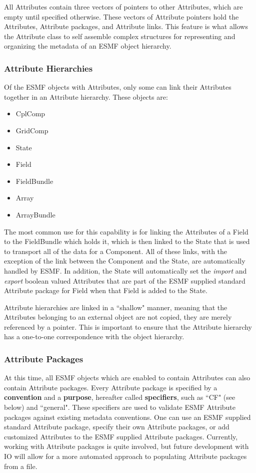 All Attributes contain three vectors of pointers to other Attributes, which are empty until specified otherwise.  These vectors of Attribute pointers hold the Attributes, Attribute packages, and Attribute links.  This feature is what allows the Attribute class to self assemble complex structures for representing and organizing the metadata of an ESMF object hierarchy.

\subsubsection{Attribute Hierarchies}

Of the ESMF objects with Attributes, only some can link their Attributes together in an Attribute hierarchy.  These objects are:

\begin{itemize}
\item CplComp
\item GridComp
\item State
\item Field
\item FieldBundle
\item Array
\item ArrayBundle
\end{itemize}

The most common use for this capability is for linking the Attributes of a Field to the FieldBundle which holds it, which is then linked to the State that is used to transport all of the data for a Component.  All of these links, with the exception of the link between the Component and the State, are automatically handled by ESMF.  In addition, the State will automatically set the {\it import} and {\it export} boolean valued Attributes that are part of the ESMF supplied standard Attribute package for Field when that Field is added to the State. 

Attribute hierarchies are linked in a ``shallow" manner, meaning that the Attributes belonging to an external object are not copied, they are merely referenced by a pointer.  This is important to ensure that the Attribute hierarchy has a one-to-one correspondence with the object hierarchy.  

\subsubsection{Attribute Packages}

At this time, all ESMF objects which are enabled to contain Attributes can also contain Attribute packages.  Every Attribute package is specified by a {\bf convention} and a {\bf purpose}, hereafter called {\bf specifiers}, such as ``CF" (see below) and ``general".  These specifiers are used to validate ESMF Attribute packages against existing metadata conventions.  One can use an ESMF supplied standard Attribute package, specify their own Attribute packages, or add customized Attributes to the ESMF supplied Attribute packages.  Currently, working with Attribute packages is quite involved, but future development with IO will allow for a more automated approach to populating Attribute packages from a file.

